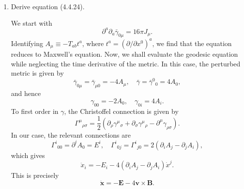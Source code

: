 \begin{enumerate}[label=\alph*)]
    \item Derive equation (4.4.24).
    \begin{solution}
        We start with
        \begin{equation}
            \partial^a \partial_a \bar{\gamma}_{0\mu} = 16\pi J_\mu.
        \end{equation}
        Identifying $A_\mu \equiv -T_{ab}t^a$, where $t^a = (\partial/\partial x^0)^a$, we find that the equation reduces to Maxwell's equation. Now, we shall evaluate the geodesic equation while neglecting the time derivative of the metric. In this case, the perturbed metric is given by
        \begin{equation}
            \bar{\gamma}_{0\mu} = \bar{\gamma}_{\mu0} = -4A_\mu, \quad \bar \gamma = \bar \gamma^0{}_0 = 4A_0,
        \end{equation}
        and hence
        \begin{equation}
            \gamma_{00} = -2A_0, \quad \gamma_{0i} = 4A_i.
        \end{equation}
        To first order in $\gamma$, the Christoffel connection is given by
        \begin{equation}
            \Gamma^\mu{}_{\rho\sigma} = \frac{1}{2}(\partial_\rho \gamma^\mu{}_\sigma + \partial_\sigma \gamma^\mu{}_\rho - \partial^\mu \gamma_{\rho\sigma}).
        \end{equation}
        In our case, the relevant connections are
        \begin{equation}
            \Gamma^i{}_{00} = \partial^iA_0 = E^i, \quad \Gamma^i{}_{0j} = \Gamma^i{}_{j0} = 2(\partial_i A_j - \partial_j A_i),
        \end{equation}
        which gives
        \begin{equation}
            \ddot x_i = - E_i -4(\partial_i A_j - \partial_j A_i)\dot x^j.
        \end{equation}
        This is precisely
        \begin{equation}
            \ddot{\mathbf{x}} = - \mathbf{E} - 4\mathbf{v}\times \mathbf{B}.
        \end{equation}
    \end{solution}


\end{enumerate}
